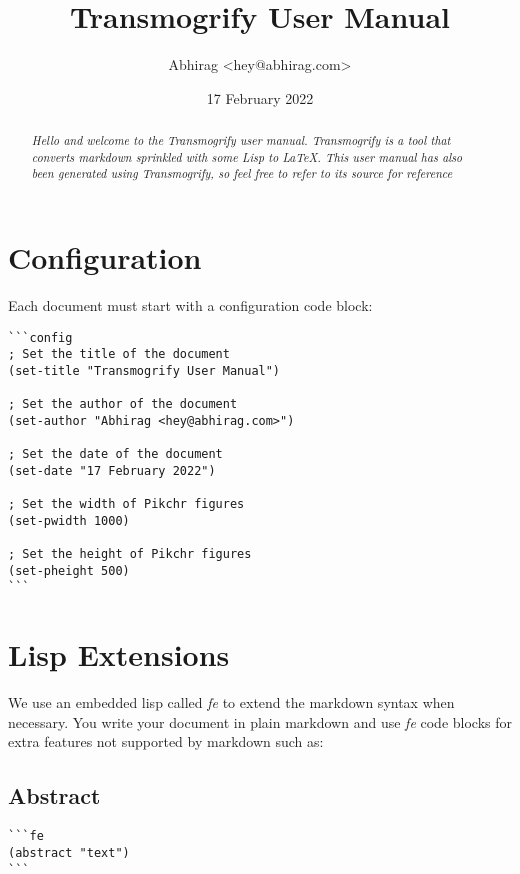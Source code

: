 \documentclass{tufte-handout}
\title{Transmogrify User Manual}
\author{Abhirag <hey@abhirag.com>}
\date{17 February 2022}
\begin{document}
\maketitle
\begin{abstract}
\textit{Hello and welcome to the Transmogrify user manual. 
Transmogrify is a tool that converts markdown sprinkled with some Lisp to LaTeX. This user manual 
has also been generated using Transmogrify, so feel free to refer to its source for reference}
\end{abstract}\section{Configuration}\label{sec:1}
Each document must start with a configuration code block:\begin{verbatim}
```config
; Set the title of the document
(set-title "Transmogrify User Manual")

; Set the author of the document 
(set-author "Abhirag <hey@abhirag.com>")

; Set the date of the document
(set-date "17 February 2022")

; Set the width of Pikchr figures 
(set-pwidth 1000)

; Set the height of Pikchr figures 
(set-pheight 500)
```

\end{verbatim}
\section{Lisp Extensions}\label{sec:2}
We use an embedded lisp called \textit{fe} to extend the markdown syntax when necessary.
You write your document in plain markdown and use \textit{fe} code blocks for extra features
not supported by markdown such as:\subsection{Abstract}\begin{verbatim}
```fe
(abstract "text")
```

\end{verbatim}
\end{document}
